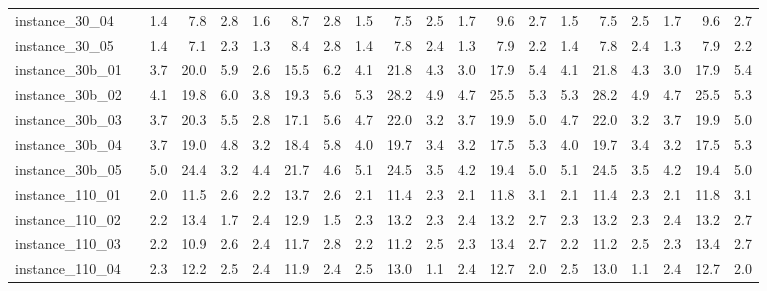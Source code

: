 \documentclass[12pt,a4paper,openright,twoside]{book}
\begin{document}
\begin{table}[H]
{\begin{tabular}{|ll|rrrrrr|rrrrrr|rrrrrr|}
 instance\_30\_04             &     &        1.4  &   7.8  &  2.8  &   1.6  &   8.7  &  2.8  &       1.5  &   7.5  &  2.5  &   1.7  &   9.6  &  2.7  &      1.5  &   7.5  &  2.5  &   1.7  &   9.6  &  2.7  \\        
 instance\_30\_05             &     &        1.4  &   7.1  &  2.3  &   1.3  &   8.4  &  2.8  &       1.4  &   7.8  &  2.4  &   1.3  &   7.9  &  2.2  &      1.4  &   7.8  &  2.4  &   1.3  &   7.9  &  2.2  \\        
 instance\_30b\_01             &     &        3.7  &   20.0  &  5.9  &   2.6  &   15.5  &  6.2  &     4.1  &   21.8  &  4.3  &   3.0  &   17.9  &  5.4  &    4.1  &   21.8  &  4.3  &   3.0  &   17.9  &  5.4  \\        
 instance\_30b\_02             &     &        4.1  &   19.8  &  6.0  &   3.8  &   19.3  &  5.6  &     5.3  &   28.2  &  4.9  &   4.7  &   25.5  &  5.3  &    5.3  &   28.2  &  4.9  &   4.7  &   25.5  &  5.3  \\        
 instance\_30b\_03             &     &        3.7  &   20.3  &  5.5  &   2.8  &   17.1  &  5.6  &     4.7  &   22.0  &  3.2  &   3.7  &   19.9  &  5.0  &    4.7  &   22.0  &  3.2  &   3.7  &   19.9  &  5.0  \\        
 instance\_30b\_04             &     &        3.7  &   19.0  &  4.8  &   3.2  &   18.4  &  5.8  &     4.0  &   19.7  &  3.4  &   3.2  &   17.5  &  5.3  &    4.0  &   19.7  &  3.4  &   3.2  &   17.5  &  5.3  \\        
 instance\_30b\_05             &     &        5.0  &   24.4  &  3.2  &   4.4  &   21.7  &  4.6  &     5.1  &   24.5  &  3.5  &   4.2  &   19.4  &  5.0  &    5.1  &   24.5  &  3.5  &   4.2  &   19.4  &  5.0  \\        
 instance\_110\_01            &     &        2.0  &   11.5  &  2.6  &   2.2  &   13.7  &  2.6  &     2.1  &   11.4  &  2.3  &   2.1  &   11.8  &  3.1  &    2.1  &   11.4  &  2.3  &   2.1  &   11.8  &  3.1   \\        
 instance\_110\_02            &     &        2.2  &   13.4  &  1.7  &   2.4  &   12.9  &  1.5  &     2.3  &   13.2  &  2.3  &   2.4  &   13.2  &  2.7  &    2.3  &   13.2  &  2.3  &   2.4  &   13.2  &  2.7   \\           
 instance\_110\_03            &     &        2.2  &   10.9  &  2.6  &   2.4  &   11.7  &  2.8  &     2.2  &   11.2  &  2.5  &   2.3  &   13.4  &  2.7  &    2.2  &   11.2  &  2.5  &   2.3  &   13.4  &  2.7   \\           
 instance\_110\_04            &     &        2.3  &   12.2  &  2.5  &   2.4  &   11.9  &  2.4  &     2.5  &   13.0  &  1.1  &   2.4  &   12.7  &  2.0  &    2.5  &   13.0  &  1.1  &   2.4  &   12.7  &  2.0   \\           

\end{tabular}}
\end{table}
\end{document}
